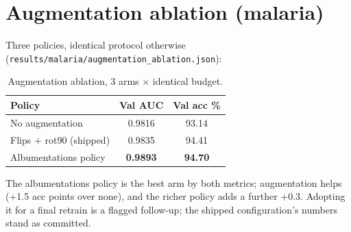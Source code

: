 \section{Augmentation ablation (malaria)}
Three policies, identical protocol otherwise
(\texttt{results/malaria/augmentation\_ablation.json}):
\begin{table}[h]\centering\small
\begin{tabular}{lcc}
\hline Policy & Val AUC & Val acc \% \\ \hline
No augmentation & 0.9816 & 93.14 \\
Flips + rot90 (shipped) & 0.9835 & 94.41 \\
Albumentations policy & \textbf{0.9893} & \textbf{94.70} \\
\hline
\end{tabular}
\caption{Augmentation ablation, 3 arms $\times$ identical budget.}
\label{tab:ablation}
\end{table}
The albumentations policy is the best arm by both metrics; augmentation
helps (+1.5 acc points over none), and the richer policy adds a further
+0.3. Adopting it for a final retrain is a flagged follow-up; the shipped
configuration's numbers stand as committed.
